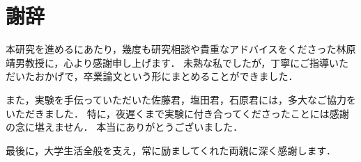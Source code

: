 \chapter*{謝辞}

本研究を進めるにあたり，幾度も研究相談や貴重なアドバイスをくださった林原靖男教授に，心より感謝申し上げます．
未熟な私でしたが，丁寧にご指導いただいたおかげで，卒業論文という形にまとめることができました．

また，実験を手伝っていただいた佐藤君，塩田君，石原君には，多大なご協力をいただきました．
特に，夜遅くまで実験に付き合ってくださったことには感謝の念に堪えません．
本当にありがとうございました．

最後に，大学生活全般を支え，常に励ましてくれた両親に深く感謝します．
%
